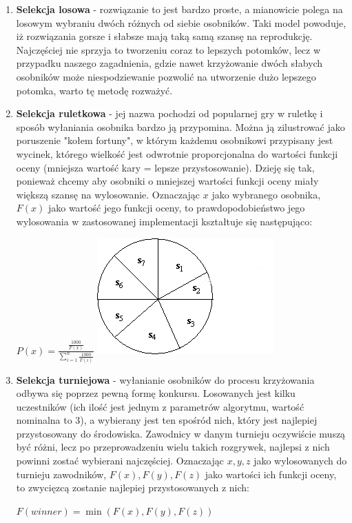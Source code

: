 \begin{enumerate}
\item \textbf{Selekcja losowa} - rozwiązanie to jest bardzo proste, a mianowicie polega na losowym wybraniu dwóch różnych od siebie osobników. Taki model powoduje, iż rozwiązania gorsze i słabsze mają taką samą szansę na reprodukcję. Najczęściej nie sprzyja to tworzeniu coraz to lepszych potomków, lecz w przypadku naszego zagadnienia, gdzie nawet krzyżowanie dwóch słabych osobników może niespodziewanie pozwolić na utworzenie dużo lepszego potomka, warto tę metodę rozważyć.
\item \textbf{Selekcja ruletkowa} - jej nazwa pochodzi od popularnej gry w ruletkę i sposób wyłaniania osobnika bardzo ją przypomina. Można ją zilustrować jako poruszenie "kołem fortuny", w którym każdemu osobnikowi przypisany jest wycinek, którego wielkość jest odwrotnie proporcjonalna do wartości funkcji oceny (mniejsza wartość kary = lepsze przystosowanie). Dzieję się tak, ponieważ chcemy aby osobniki o mniejszej wartości funkcji oceny miały większą szansę na wylosowanie. Oznaczając $x$ jako wybranego osobnika, $F(x)$ jako wartość jego funkcji oceny, to prawdopodobieństwo jego wylosowania w zastosowanej implementacji kształtuje się następująco:
\begin{center}
$P(x) = \frac{\frac{1000}{F(x)}}{\sum_{i=1}^{n}\frac{1000}{F(i)}}$
\includegraphics[scale=0.5]{img/rouletteSelect.png}
\end{center}
\item \textbf{Selekcja turniejowa} - wyłanianie osobników do procesu krzyżowania odbywa się poprzez pewną formę konkursu. Losowanych jest kilku uczestników (ich ilość jest jednym z parametrów algorytmu, wartość nominalna to 3), a wybierany jest ten spośród nich, który jest najlepiej przystosowany do środowiska. Zawodnicy w danym turnieju oczywiście muszą być różni, lecz po przeprowadzeniu wielu takich rozgrywek, najlepsi z nich powinni zostać wybierani najczęściej. Oznaczając $x, y, z$ jako wylosowanych do turnieju zawodników, $F(x), F(y), F(z)$ jako wartości ich funkcji oceny, to zwycięzcą zostanie najlepiej przystosowanych z nich:
\begin{center}
$F(winner) = \min(F(x), F(y), F(z))$
\end{center}
\end{enumerate}
